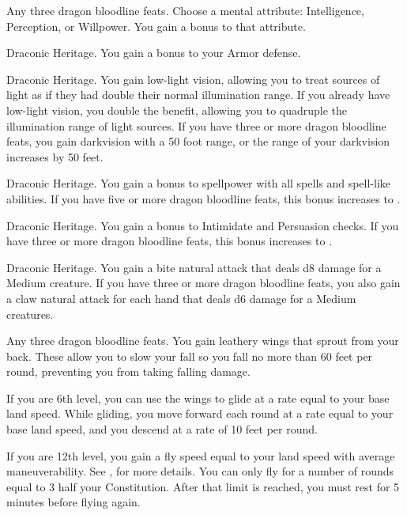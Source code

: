 \featpre Any three dragon bloodline feats.
\featben Choose a mental attribute: Intelligence, Perception, or Willpower.
You gain a  bonus to that attribute.

\featpre Draconic Heritage.
\featben You gain a  bonus to your Armor defense.

\featpre Draconic Heritage.
\featben You gain low-light vision, allowing you to treat sources of light as if they had double their normal illumination range.
If you already have low-light vision, you double the benefit, allowing you to quadruple the illumination range of light sources.
If you have three or more dragon bloodline feats, you gain darkvision with a 50 foot range, or the range of your darkvision increases by 50 feet.

\featpre Draconic Heritage.
\featben You gain a  bonus to spellpower with all spells and spell-like abilities.
If you have five or more dragon bloodline feats, this bonus increases to .

\featpre Draconic Heritage.
\featben You gain a  bonus to Intimidate and Persuasion checks.
If you have three or more dragon bloodline feats, this bonus increases to .

\featpre Draconic Heritage.
\featben You gain a bite natural attack that deals d8 damage for a Medium creature.
If you have three or more dragon bloodline feats, you also gain a claw natural attack for each hand that deals d6 damage for a Medium creatures.

\featpre Any three dragon bloodline feats.
\featben You gain leathery wings that sprout from your back.
These allow you to slow your fall so you fall no more than 60 feet per round, preventing you from taking falling damage.

If you are 6th level, you can use the wings to glide at a rate equal to your base land speed.
While gliding, you move forward each round at a rate equal to your base land speed, and you descend at a rate of 10 feet per round.

If you are 12th level, you gain a fly speed equal to your land speed with average maneuverability.
See , for more details.
You can only fly for a number of rounds equal to 3 \add half your Constitution.
After that limit is reached, you must rest for 5 minutes before flying again.

